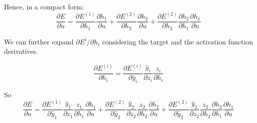\documentclass[a4paper]{article}
\begin{document}
Hence, in a compact form:
\begin{equation}
    \frac{\partial E}{\partial u} = \frac{\partial E^{(1)}}{\partial h_1} \frac{\partial h_1}{\partial u} + \frac{\partial E^{(2)}}{\partial h_2} \frac{\partial h_2}{\partial u} + \frac{\partial E^{(2)}}{\partial h_2} \frac{\partial h_2}{\partial h_1} \frac{\partial h_1}{\partial u} 
\end{equation}

We can further expand $\partial E^{i} / \partial h_i $ considering the target and the activation function derivatives.

\begin{equation}
    \frac{\partial E^{(i)}}{\partial h_i} = \frac{\partial E^{(i)}}{\partial \hat{y}_i} \frac{\hat{y}_i}{\partial z_i} \frac{z_i}{\partial h_i}
\end{equation}

So
\begin{equation}
    \frac{\partial E}{\partial u} = \frac{\partial E^{(1)}}{\partial \hat{y}_1} \frac{\hat{y}_1}{\partial z_1} \frac{z_1}{\partial h_1}  \frac{\partial h_1}{\partial u} + 
    \frac{\partial E^{(2)}}{\partial \hat{y}_2} \frac{\hat{y}_2}{\partial z_2} \frac{z_2}{\partial h_2} \frac{\partial h_2}{\partial u} + \frac{\partial E^{(2)}}{\partial \hat{y}_2} \frac{\hat{y}_2}{\partial z_2} \frac{z_2}{\partial h_2} \frac{\partial h_2}{\partial h_1} \frac{\partial h_1}{\partial u} 
\end{equation}

% 
\end{document}
